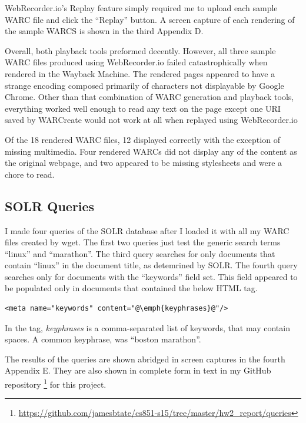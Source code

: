 \documentclass[a4paper,12pt]{article}
\begin{document}
WebRecorder.io's Replay feature simply required me to upload each sample WARC file and click the ``Replay''
button. A screen capture of each rendering of the sample WARCS is shown in the third Appendix D.

Overall, both playback tools preformed decently. However, all three sample WARC files produced using
WebRecorder.io failed catastrophically when rendered in the Wayback Machine. The rendered pages appeared to
have a strange encoding composed primarily of characters not displayable by Google Chrome. Other than that
combination of WARC generation and playback tools, everything worked well enough to read any text on the page
except one URI saved by WARCreate would not work at all when replayed using WebRecorder.io

Of the 18 rendered WARC files, 12 displayed correctly with the exception of missing multimedia. Four rendered
WARCs did not display any of the content as the original webpage, and two appeared to be missing stylesheets
and were a chore to read.

\subsection{SOLR Queries}
I made four queries of the SOLR database after I loaded it with all my WARC files created by wget. The first
two queries just test the generic search terms ``linux'' and ``marathon''. The third query searches for only
documents that contain ``linux'' in the document title, as detemrined by SOLR. The fourth query searches only
for documents with the ``keywords'' field set. This field appeared to be populated only in documents that
contained the below HTML tag.
\begin{lstlisting}[basicstyle=\ttfamily,escapechar=@]
    <meta name="keywords" content="@\emph{keyphrases}@"/>
\end{lstlisting}
In the tag, \emph{keyphrases} is a comma-separated list of keywords, that may contain spaces. A common
keyphrase, was ``boston marathon''.

The results of the queries are shown abridged in screen captures in the fourth Appendix E. They are also shown
in complete form in text in my GitHub repository
\footnote{\url{https://github.com/jamesbtate/cs851-s15/tree/master/hw2_report/queries}} for this project.
\end{document}
